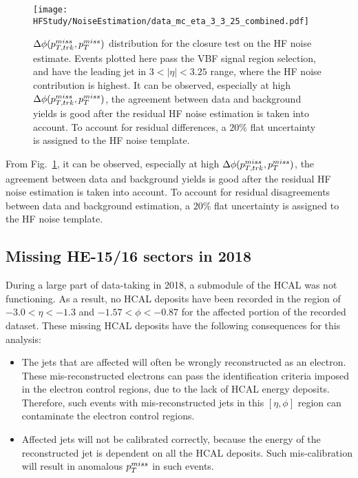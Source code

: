 \begin{figure}[h!]
    \centering
    \texttt{[image: HFStudy/NoiseEstimation/data\_mc\_eta\_3\_3\_25\_combined.pdf]}
    \caption{$\Delta\phi(p_{T,trk}^{miss}, p_T^{miss})$ distribution for the closure test on the HF noise estimate. Events plotted here pass the VBF signal 
    region selection, and have the leading jet in $3 < |\eta| < 3.25$ range, where the HF noise contribution is highest.
    It can be observed, especially at high $\Delta\phi(p_{T,trk}^{miss}, p_T^{miss})$, the agreement between data and background yields is good
    after the residual HF noise estimation is taken into account. To account for residual differences, a $20\%$ flat uncertainty is assigned to the HF noise template.}
    \label{fig:hf_noise_closure}
\end{figure}

From Fig.~\ref{fig:hf_noise_closure}, it can be observed, especially at high $\Delta\phi(p_{T,trk}^{miss}, p_T^{miss})$, the agreement between data and background yields is good
after the residual HF noise estimation is taken into account. To account for residual disagreements between data and background estimation, a $20\%$ flat uncertainty
is assigned to the HF noise template. 

\subsection{Missing HE-15/16 sectors in 2018}
\label{subsec:hem}

During a large part of data-taking in 2018, a submodule of the HCAL was not
functioning. As a result, no HCAL deposits have been recorded in the region of
$-3.0 < \eta < -1.3$ and $-1.57 < \phi < -0.87$ for the affected portion of the
recorded dataset. These missing HCAL deposits have the following consequences
for this analysis:

\begin{itemize}
    \item The jets that are affected will often be wrongly reconstructed as an electron. These mis-reconstructed
    electrons can pass the identification criteria imposed in the electron control regions, due
    to the lack of HCAL energy deposits. Therefore, such events with mis-reconstructed jets in
    this $[\eta,\phi]$ region can contaminate the electron control regions.
    \item Affected jets will not be calibrated correctly, because the energy of the reconstructed jet
    is dependent on all the HCAL deposits. Such mis-calibration will result in anomalous $p_T^{miss}$ in such events. 
\end{itemize}

